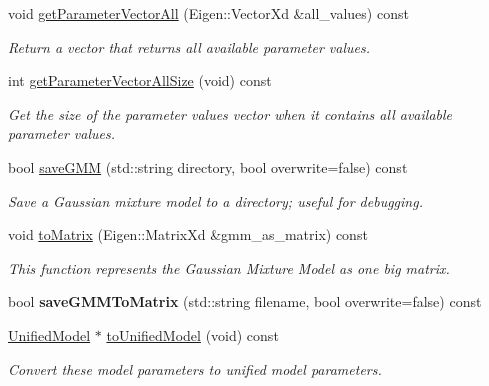 \begin{DoxyCompactItemize}
void \hyperlink{classDmpBbo_1_1ModelParametersGMR_a29429ff2771d1e56cfba7250d38da4b1}{get\+Parameter\+Vector\+All} (Eigen\+::\+Vector\+Xd \&all\+\_\+values) const 
\begin{DoxyCompactList}\small\item\em Return a vector that returns all available parameter values. \end{DoxyCompactList}\item 
int \hyperlink{classDmpBbo_1_1ModelParametersGMR_ab24d2485b3b795b516f4844f225100eb}{get\+Parameter\+Vector\+All\+Size} (void) const 
\begin{DoxyCompactList}\small\item\em Get the size of the parameter values vector when it contains all available parameter values. \end{DoxyCompactList}\item 
bool \hyperlink{classDmpBbo_1_1ModelParametersGMR_a264d7db9f3a3a0f6371da28c5f0afef0}{save\+G\+M\+M} (std\+::string directory, bool overwrite=false) const 
\begin{DoxyCompactList}\small\item\em Save a Gaussian mixture model to a directory; useful for debugging. \end{DoxyCompactList}\item 
void \hyperlink{classDmpBbo_1_1ModelParametersGMR_aa5c1479a40880e96565cff656369e3b5}{to\+Matrix} (Eigen\+::\+Matrix\+Xd \&gmm\+\_\+as\+\_\+matrix) const 
\begin{DoxyCompactList}\small\item\em This function represents the Gaussian Mixture Model as one big matrix. \end{DoxyCompactList}\item 
\hypertarget{classDmpBbo_1_1ModelParametersGMR_a2d90273c2c9bbe3cb05e4ab72d4c3dcc}{bool {\bfseries save\+G\+M\+M\+To\+Matrix} (std\+::string filename, bool overwrite=false) const }\label{classDmpBbo_1_1ModelParametersGMR_a2d90273c2c9bbe3cb05e4ab72d4c3dcc}

\item 
\hyperlink{classDmpBbo_1_1UnifiedModel}{Unified\+Model} $\ast$ \hyperlink{classDmpBbo_1_1ModelParametersGMR_a6e3534f93333334c2f0126f8fc4d29d1}{to\+Unified\+Model} (void) const 
\begin{DoxyCompactList}\small\item\em Convert these model parameters to unified model parameters. \end{DoxyCompactList}\end{DoxyCompactItemize}
